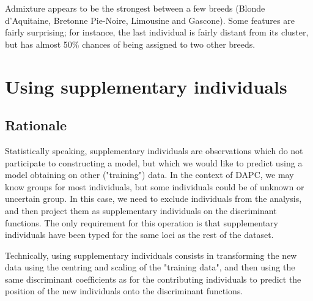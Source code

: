 \documentclass{article}
\begin{document}
\noindent Admixture appears to be the strongest between a few breeds (Blonde d'Aquitaine, Bretonne Pie-Noire,
Limousine and Gascone). Some features are fairly surprising; for instance, the last individual is
fairly distant from its cluster, but has almost 50\% chances of being assigned to two other breeds.






\section{Using supplementary individuals}

\subsection{Rationale}

Statistically speaking, supplementary individuals are observations which do not participate to
constructing a model, but which we would like to predict using a model obtaining on other ("training") data.
In the context of DAPC, we may know groups for most individuals, but some individuals could be of
unknown or uncertain group. In this case, we need to exclude individuals from the analysis, and then
project them as supplementary individuals on the discriminant functions.
The only requirement for this operation is that supplementary individuals have been typed for the
same loci as the rest of the dataset.

Technically, using supplementary individuals consists in transforming the new data using the centring
and scaling of the "training data", and then using the same discriminant coefficients as
for the contributing individuals to predict the position of the new individuals onto the
discriminant functions.


\end{document}
